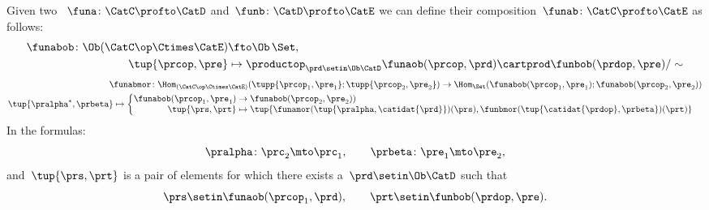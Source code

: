 \begin{widepar}
    \begin{ctdefinition}
        \label{def:profunctor-composition}
        Given two ~$\funa\colon \CatC \profto \CatD$ and~$\funb\colon \CatD \profto \CatE$
        we can define their composition~$\funab\colon \CatC \profto \CatE$ as follows:
        \begin{equation}
            \begin{aligned}
                \funabob \colon \Ob(\CatC\op \Ctimes \CatE) & \fto  \Ob\, \Set, \\
                \tup{\prcop, \pre}                          & \mapsto \productop_{\prd\setin\Ob \CatD} \funaob(\prcop, \prd) \cartprod \funbob(\prdop, \pre) / \sim
            \end{aligned}
        \end{equation}
        \begin{equation}
            \begin{aligned}
                \funabmor  \colon \Hom_{(\CatC\op \Ctimes \CatE)}( \tupp{\prcop_1, \pre_1}; \tupp{\prcop_2, \pre_2}) \to \Hom_{\Set}( \funabob(\prcop_1, \pre_1); \funabob(\prcop_2, \pre_2)) \\
                \tup{\pralpha^\ast, \prbeta} \mapsto  \begin{cases}
                                                          \begin{aligned}
                        \funabob(\prcop_1, \pre_1) & \to   \funabob(\prcop_2, \pre_2)) \\
                        \tup{\prs, \prt}           & \mapsto  \tup{
                            \funamor(\tup{\pralpha, \catidat{\prd}})(\prs),
                            \funbmor(\tup{\catidat{\prdop}, \prbeta})(\prt)}
                    \end{aligned}
                                                      \end{cases}
            \end{aligned}
        \end{equation}
        In the formulas:
        \begin{equation}
            \pralpha\colon \prc_2 \mto \prc_1, \qquad
            \prbeta\colon \pre_1 \mto \pre_2,
        \end{equation}
        and~$\tup{\prs, \prt}$ is a pair of elements for which there exists a~$\prd\setin\Ob \CatD$ such that
        \begin{equation}
            \prs \setin \funaob(\prcop_1, \prd), \qquad\prt \setin \funbob(\prdop, \pre).
        \end{equation}
    \end{ctdefinition}
\end{widepar}

